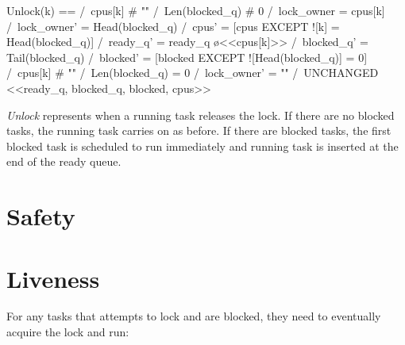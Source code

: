 \begin{tla}
Unlock(k) == 
    \/  /\ cpus[k] # "" 
        /\ Len(blocked_q) # 0
        /\ lock_owner = cpus[k]
        /\ lock_owner' = Head(blocked_q)
        /\ cpus' = [cpus EXCEPT ![k] = Head(blocked_q)]
        /\ ready_q' = ready_q \o <<cpus[k]>>
        /\ blocked_q' = Tail(blocked_q)
        /\ blocked' = [blocked EXCEPT ![Head(blocked_q)] = 0]
    \/  /\ cpus[k] # "" 
        /\ Len(blocked_q) = 0
        /\ lock_owner' = ""
        /\ UNCHANGED <<ready_q, blocked_q, blocked, cpus>>
\end{tla}
\begin{tlatex}
%
%
%
%
%
%
%
%
%
\end{tlatex}
\newline

\textit{Unlock} represents when a running task releases the lock. If there are
no blocked tasks, the running task carries on as before. If there are blocked
tasks, the first blocked task is scheduled to run immediately and running task
is inserted at the end of the ready queue. 

\section{Safety}

\section{Liveness}

For any tasks that attempts to lock and are blocked, they need to eventually 
acquire the lock and run:\newline

